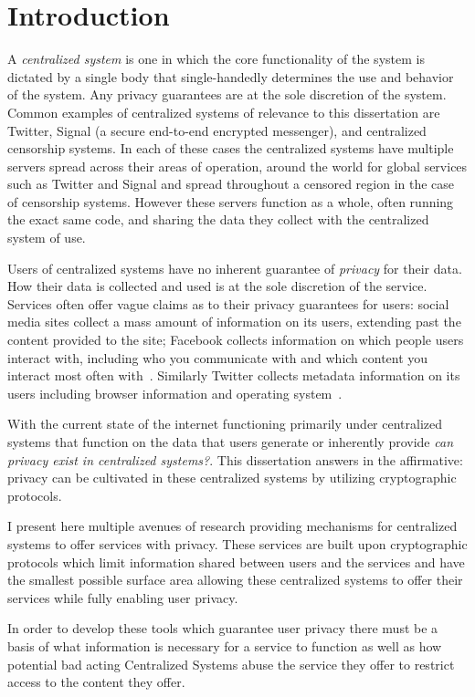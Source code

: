 \chapter{Introduction}

A \emph{centralized system} is one in which the core functionality of the system
is dictated by a single body that single-handedly determines the use and
behavior of the system. Any privacy guarantees are at the sole discretion of the
system. Common examples of centralized systems of relevance to this dissertation
are Twitter, Signal (a secure end-to-end encrypted messenger), and centralized
censorship systems. In each of these cases the centralized systems have multiple
servers spread across their areas of operation, around the world for global
services such as Twitter and Signal and spread throughout a censored region in
the case of censorship systems. However these servers function as a whole, often
running the exact same code, and sharing the data they collect with the
centralized system of use.

Users of centralized systems have no inherent guarantee of \emph{privacy} for
their data. How their data is collected and used is at the sole discretion of
the service. Services often offer vague claims as to their privacy guarantees
for users: social media sites collect a mass amount of information on its users,
extending past the content provided to the site; Facebook collects information
on which people users interact with, including who you communicate with and
which content you interact most often with~\cite{fb-privacy}. Similarly Twitter
collects metadata information on its users including browser information and
operating system~\cite{twitter-privacy}.

With the current state of the internet functioning primarily under centralized
systems that function on the data that users generate or inherently provide
\emph{can privacy exist in centralized systems?}. This dissertation answers in
the affirmative: privacy can be cultivated in these centralized systems by
utilizing cryptographic protocols.

I present here multiple avenues of research providing mechanisms for centralized
systems to offer services with privacy. These services are built upon
cryptographic protocols which limit information shared between users and the
services and have the smallest possible surface area allowing these centralized
systems to offer their services while fully enabling user privacy.

In order to develop these tools which guarantee user privacy there must be a
basis of what information is necessary for a service to function as well as how
potential bad acting Centralized Systems abuse the service they offer to
restrict access to the content they offer.


